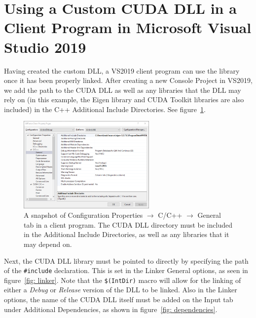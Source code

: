 \documentclass[11pt,letterpaper]{article}
\begin{document}
\section{Using a Custom CUDA DLL in a Client Program in Microsoft Visual Studio 2019}

Having created the custom DLL, a VS2019 client program can use the library once it has been properly linked. After creating a new Console Project in VS2019, we add the path to the CUDA DLL as well as any libraries that the DLL may rely on (in this example, the Eigen library and CUDA Toolkit libraries are also included) in the C++ Additional Include Directories. See figure~\ref{fig: client includes}.

\begin{figure}
    \centering
    \includegraphics[width=0.6\textwidth]{DLL_ClientIncludes.png}
    \caption{A snapshot of Configuration Properties $\to$ C/C++ $\to$ General tab in a client program. The CUDA DLL directory must be included in the Additional Include Directories, as well as any libraries that it may depend on.}
    \label{fig: client includes}
\end{figure}

Next, the CUDA DLL library must be pointed to directly by specifying the path of the \verb+#include+ declaration. This is set in the Linker General options, as seen in figure~\ref{fig: linker}. Note that the \verb+$(IntDir)+ macro will allow for the linking of either a \emph{Debug} or \emph{Release} version of the DLL to be linked. Also in the Linker options, the name of the CUDA DLL itself must be added on the Input tab under Additional Dependencies, as shown in figure~\ref{fig: dependencies}.
\end{document}
